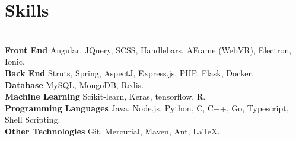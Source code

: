 \documentclass{resume}
\begin{document}
\section*{Skills}
\titlerule
\noindent
\\
\textbf{Front End} Angular, JQuery, SCSS, Handlebars, AFrame (WebVR), Electron, Ionic. \\
\textbf{Back End} Struts, Spring, AspectJ, Express.js, PHP, Flask, Docker.\\
\textbf{Database} MySQL, MongoDB, Redis. \\
\textbf{Machine Learning} Scikit-learn, Keras, tensorflow, R. \\
\textbf{Programming Languages} Java, Node.js, Python, C, C++, Go, Typescript, Shell Scripting.\\
\textbf{Other Technologies} Git, Mercurial, Maven, Ant, \LaTeX.
\end{document}
